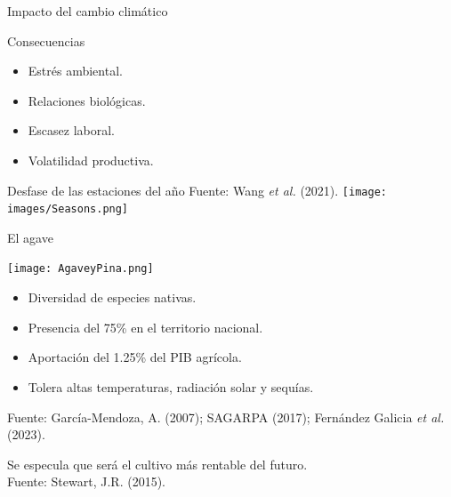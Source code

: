 \documentclass[aspectratio=169]{beamer}
\begin{document}
\begin{frame}{Impacto del cambio climático}
\vspace{-1cm}

\begin{block}{\centering Consecuencias}
       \begin{minipage}{0.5\textwidth}
			\begin{itemize}
				\item Estrés ambiental.
                \item Relaciones biológicas.
			\end{itemize}
		\end{minipage}%
		\begin{minipage}{0.5\textwidth}
			\begin{itemize}
				\item Escasez laboral.
                \item Volatilidad productiva.
			\end{itemize}
		\end{minipage}
    \end{block}
    \pause
    \begin{block}{Desfase de las estaciones del año \hfill {\scriptsize Fuente: Wang \textit{et al.} (2021).}}
    \centering
        \texttt{[image: images/Seasons.png]}
    \end{block}
\end{frame}


\begin{frame}{El agave}
	\begin{minipage}{0.5\textwidth}
		\centering\texttt{[image: AgaveyPina.png]}
	\end{minipage}%
	\begin{minipage}{0.5\textwidth}
		\begin{block}{}
			\begin{itemize}
				\item Diversidad de especies nativas.
				\item Presencia del 75\% en el territorio nacional.
				\item Aportación del 1.25\% del PIB agrícola.
				\item Tolera altas temperaturas, radiación solar y sequías.
			\end{itemize}
			 {\scriptsize Fuente: García-Mendoza, A. (2007); SAGARPA (2017);  Fernández Galicia \textit{et al.} (2023).}
		\end{block}
	\end{minipage}
	\pause\centering Se especula que será el cultivo más rentable del futuro.\\
	{\scriptsize Fuente: Stewart, J.R. (2015).}
\end{frame}
\end{document}
